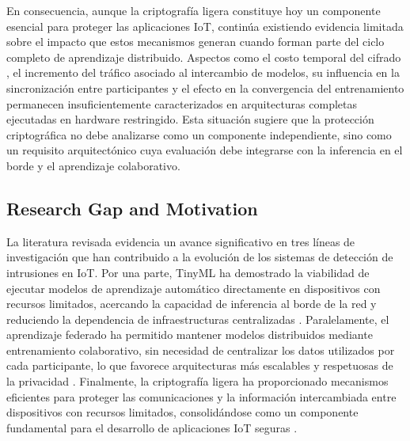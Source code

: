 \documentclass[journal,article,submit,moreauthors]{Definitions/mdpi}
\begin{document}
En consecuencia, aunque la criptografía ligera constituye hoy un componente esencial para proteger las aplicaciones IoT, continúa existiendo evidencia limitada sobre el impacto que estos mecanismos generan cuando forman parte del ciclo completo de aprendizaje distribuido. Aspectos como el costo temporal del cifrado \cite{Sorescu2025}, el incremento del tráfico asociado al intercambio de modelos, su influencia en la sincronización entre participantes y el efecto en la convergencia del entrenamiento permanecen insuficientemente caracterizados en arquitecturas completas ejecutadas en hardware restringido. Esta situación sugiere que la protección criptográfica no debe analizarse como un componente independiente, sino como un requisito arquitectónico cuya evaluación debe integrarse con la inferencia en el borde y el aprendizaje colaborativo.

\subsection{Research Gap and Motivation}
La literatura revisada evidencia un avance significativo en tres líneas de investigación que han contribuido a la evolución de los sistemas de detección de intrusiones en IoT. Por una parte, TinyML ha demostrado la viabilidad de ejecutar modelos de aprendizaje automático directamente en dispositivos con recursos limitados, acercando la capacidad de inferencia al borde de la red y reduciendo la dependencia de infraestructuras centralizadas \cite{Tekin2023,Amuthadevi2025,Dini2024}. Paralelamente, el aprendizaje federado ha permitido mantener modelos distribuidos mediante entrenamiento colaborativo, sin necesidad de centralizar los datos utilizados por cada participante, lo que favorece arquitecturas más escalables y respetuosas de la privacidad \cite{McMahan2017,Imteaj2022,Hajj2023,Ramadan2025}. Finalmente, la criptografía ligera ha proporcionado mecanismos eficientes para proteger las comunicaciones y la información intercambiada entre dispositivos con recursos limitados, consolidándose como un componente fundamental para el desarrollo de aplicaciones IoT seguras \cite{NIST800232,Kaur2025,Gusita2025}.
\end{document}
